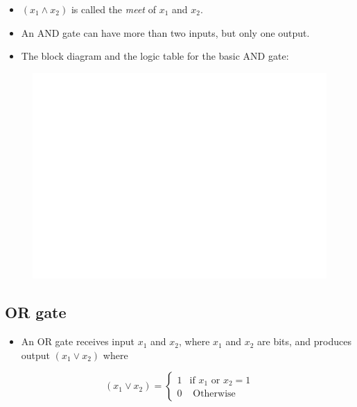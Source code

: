 \documentclass[]{book}
\providecommand{\tightlist}{%
  \setlength{\itemsep}{0pt}\setlength{\parskip}{0pt}}
\begin{document}
\begin{itemize}
\tightlist
\item
  \((x_1 \land x_2)\) is called the \emph{meet} of \(x_1\) and \(x_2\).
\item
  An AND gate can have more than two inputs, but only one output.
\item
  The block diagram and the logic table for the basic AND gate:
\end{itemize}

\begin{figure}

{\centering \includegraphics[width=1\linewidth]{figure/boxC42-1} 

}

\end{figure}

\hypertarget{or-gate}{%
\subsection{OR gate}\label{or-gate}}

\begin{itemize}
\tightlist
\item
  An OR gate receives input \(x_1\) and \(x_2\), where \(x_1\) and \(x_2\) are bits, and produces output \((x_1 \lor x_2)\) where
\end{itemize}

\begin{equation}
(x_1 \lor x_2) =
\begin{cases} 
1 & \text{if } x_1 \text{ or } x_2=1\\
0 & \text{ Otherwise }
\end{cases}
\end{equation}
\end{document}
